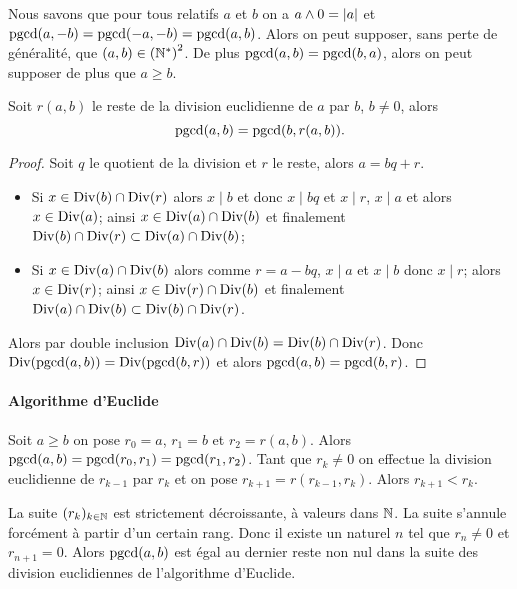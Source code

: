Nous savons que pour tous relatifs $a$ et $b$ on a $a \wedge 0 = \left\lvert a\right\rvert$ et $\operatorname{pgcd}(a,-b) = \operatorname{pgcd}(-a,-b) = \operatorname{pgcd}(a,b)$. Alors on peut supposer, sans perte de généralité, que $(a,b) \in \left(\mathbb{N}^{*}\right)^{2}$. De plus $\operatorname{pgcd}(a,b) =\operatorname{pgcd}(b,a)$, alors on peut supposer de plus que $a \geqslant b$.

\begin{lemme}
  Soit $r(a,b)$ le reste de la division euclidienne de $a$ par $b$, $b \neq 0$, alors
  \begin{equation}
    \operatorname{pgcd}(a,b) = \operatorname{pgcd}(b,r(a,b)).
  \end{equation}
\end{lemme}
\begin{proof}
  Soit $q$ le quotient de la division et $r$ le reste, alors $a=bq+r$.
  \begin{itemize}
  \item Si $x \in \operatorname{Div}(b) \cap \operatorname{Div}(r)$ alors $x \mid b$ et donc $x \mid bq$ et $x \mid r$, $x \mid a$ et alors $x \in \operatorname{Div}(a)$; ainsi $x \in \operatorname{Div}(a) \cap \operatorname{Div}(b)$ et finalement $\operatorname{Div}(b) \cap \operatorname{Div}(r) \subset \operatorname{Div}(a) \cap \operatorname{Div}(b)$;
  \item Si $x \in \operatorname{Div}(a) \cap \operatorname{Div}(b)$ alors comme $r=a-bq$, $x \mid a$ et $x \mid b$ donc $x \mid r$; alors $x \in \operatorname{Div}(r)$; ainsi $x \in \operatorname{Div}(r) \cap \operatorname{Div}(b)$ et finalement $\operatorname{Div}(a) \cap \operatorname{Div}(b) \subset \operatorname{Div}(b) \cap \operatorname{Div}(r)$.
  \end{itemize}
  Alors par double inclusion $\operatorname{Div}(a) \cap \operatorname{Div}(b)= \operatorname{Div}(b) \cap \operatorname{Div}(r)$. Donc $\operatorname{Div}(\operatorname{pgcd}(a,b)) = \operatorname{Div}(\operatorname{pgcd}(b,r))$ et alors $\operatorname{pgcd}(a,b) = \operatorname{pgcd}(b,r)$.
\end{proof}

\paragraph{Algorithme d'Euclide}

Soit $a \geqslant b$ on pose $r_0=a$, $r_1=b$ et $r_2=r(a,b)$. Alors $\operatorname{pgcd}(a,b) = \operatorname{pgcd}(r_0, r_1) = \operatorname{pgcd}(r_1,r_2)$. Tant que $r_k \neq 0$ on effectue la division euclidienne de $r_{k-1}$ par $r_k$ et on pose $r_{k+1}=r(r_{k-1},r_k)$. Alors $r_{k+1} < r_k$.

La suite $(r_k)_{k \in \mathbb{N}}$ est strictement décroissante, à valeurs dans $\mathbb{N}$. La suite s'annule forcément à partir d'un certain rang. Donc il existe un naturel $n$ tel que $r_n \neq 0$ et $r_{n+1}=0$. Alors $\operatorname{pgcd}(a,b)$ est égal au dernier reste non nul dans la suite des division euclidiennes de l'algorithme d'Euclide.

